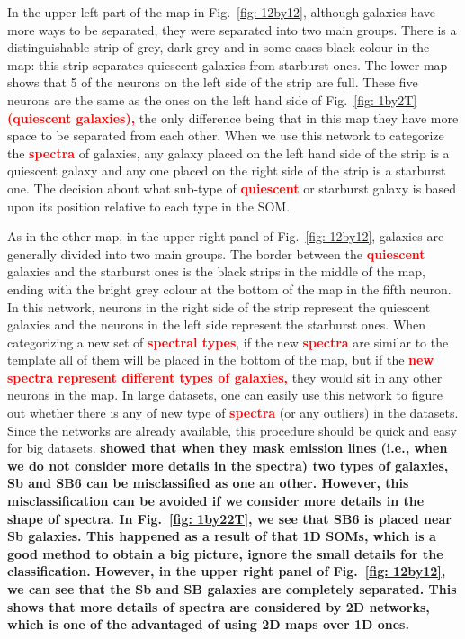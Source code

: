     
    In the upper left part of the map in Fig.~\ref{fig: 12by12}, although galaxies have more ways to be separated, they were separated into two main groups.
    There is a distinguishable strip of grey, dark grey and in some cases black colour in the map:
    this strip separates quiescent galaxies from starburst ones.
    The lower map shows that 5 of the neurons on the left side of the strip are full. 
    These five neurons are the same as the ones on the left hand side of Fig.~\ref{fig: 1by2T} \textbf{\textcolor{red}{(quiescent galaxies),}}
    the only difference being that in this map they have more space to be separated from each other.
    When we use this network to categorize the \textbf{\textcolor{red}{spectra}} of galaxies, any galaxy placed on the left hand side of the strip is a quiescent galaxy and any one placed on the right side of the strip is a starburst one.
    The decision about what sub-type of \textbf{\textcolor{red}{quiescent}} or starburst galaxy is based upon its position relative to each type in the SOM.
    
    As in the other map, in the upper right panel of Fig.~\ref{fig: 12by12}, galaxies are generally divided into two main groups.
    The border between the \textbf{\textcolor{red}{quiescent}} galaxies and the starburst ones is the black strips in the middle of the map, ending with the bright grey colour at the bottom of the map in the fifth neuron.
    In this network, neurons in the right side of the strip represent the quiescent galaxies and the neurons in the left side represent the starburst ones. 
    When categorizing a new set of \textbf{\textcolor{red}{spectral types}}, if the new \textbf{\textcolor{red}{spectra}} are similar to the \citet{Kinney96} template all of them will be placed in the bottom of the map, but if the \textbf{\textcolor{red}{new spectra represent different types of galaxies,}} they would sit in any other neurons in the map.
    In large datasets, one can easily use this network to figure out whether there is any of new type of \textbf{\textcolor{red}{spectra}} (or any outliers) in the datasets. 
    Since the networks are already available, this procedure should be quick and easy for big datasets.
    \textbf{ showed that when they mask emission lines (i.e., when we do not consider more details in the spectra) two types of galaxies, Sb and SB6 can be misclassified as one an other.
    However, this misclassification can be avoided if we consider more details in the shape of spectra. 
    In Fig.~\ref{fig: 1by22T}, we see that SB6 is placed near Sb galaxies. 
    This happened as a result of that 1D SOMs, which is a good method to obtain a big picture, ignore the small details for the classification. 
    However, in the upper right panel of Fig.~\ref{fig: 12by12}, we can see that the Sb and SB galaxies are completely separated. 
    This shows that more details of spectra are considered by 2D networks, which is one of the advantaged of using 2D maps over 1D ones.}
    
